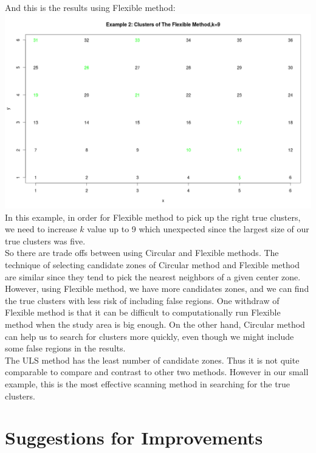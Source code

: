 \documentclass[12pt]{article}
\begin{document}
And this is the results using Flexible method:\\
\includegraphics[scale=0.2]{ex2:Flexible}\\
In this example, in order for Flexible method to pick up the right true clusters, we need to increase $k$ value up to 9 which unexpected since the largest size of our true clusters was five. \\

So there are trade offs between using Circular and Flexible methods. The technique of selecting candidate zones of Circular method and Flexible method are similar since they tend to pick the nearest neighbors of a given center zone. However, using Flexible method, we have more candidates zones, and we can find the true clusters with less risk of including false regions. One withdraw of Flexible method is that it can be difficult to computationally run Flexible method when the study area is big enough. On the other hand, Circular method can help us to search for clusters more quickly, even though we might include some false regions in the results. \\
   
The ULS method has the least number of candidate zones. Thus it is not quite comparable to compare and contrast to other two methods. However in our small example, this is the most effective scanning method in searching for the true clusters. \\



\section{Suggestions for Improvements}
\end{document}
